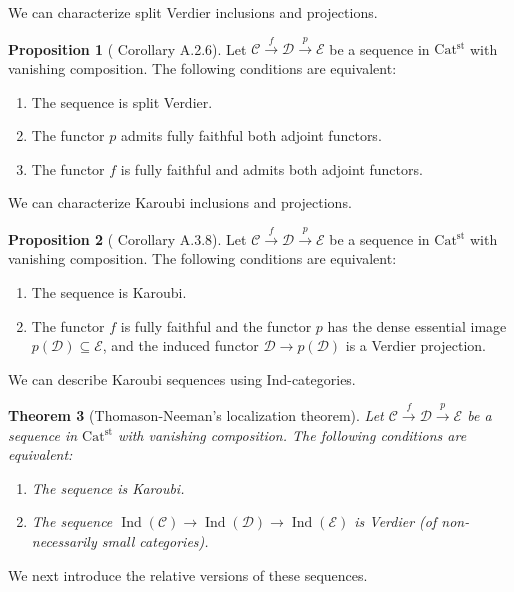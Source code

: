 \documentclass[a4paper,dvipdfmx,11pt,reqno]{amsart}
\newcommand{\C}{\mathcal{C}}
\newcommand{\D}{\mathcal{D}}
\newcommand{\E}{\mathcal{E}}
\DeclareMathOperator{\Ind}{Ind}
\newcommand{\Catst}{\mathrm{Cat^{st}}}
\newtheorem{theorem}{Theorem}[section]
\theoremstyle{definition}
\newtheorem{proposition}[theorem]{Proposition}
\begin{document}
We can characterize split Verdier inclusions and projections.

\begin{proposition}[\cite{CDH23} Corollary A.2.6] \label{CDH23.cor.A.2.6}
  Let $\C \xrightarrow{f} \D \xrightarrow{p} \E$ be a sequence in $\Catst$ with vanishing composition.
  The following conditions are equivalent:
  \begin{enumerate}
    \item The sequence is split Verdier.
    \item The functor $p$ admits fully faithful both adjoint functors.
    \item The functor $f$ is fully faithful and admits both adjoint functors.
  \end{enumerate}
\end{proposition}

We can characterize Karoubi inclusions and projections.

\begin{proposition}[\cite{CDH23} Corollary A.3.8] \label{CDH23.cor.A.3.8}
  Let $\C \xrightarrow{f} \D \xrightarrow{p} \E$ be a sequence in $\Catst$ with vanishing composition.
  The following conditions are equivalent:
  \begin{enumerate}
    \item The sequence is Karoubi.
    \item The functor $f$ is fully faithful and the functor $p$ has the dense essential image $p(\D) \subseteq \E$, and the induced functor $\D \to p(\D)$ is a Verdier projection.
  \end{enumerate}
\end{proposition}

We can describe Karoubi sequences using Ind-categories. 

\begin{theorem}[Thomason-Neeman's localization theorem] \label{Ber.thrm.3.47}
  Let $\C \xrightarrow{f} \D \xrightarrow{p} \E$ be a sequence in $\Catst$ with vanishing composition.
  The following conditions are equivalent:
  \begin{enumerate}
    \item The sequence is Karoubi.
    \item The sequence $\Ind(\C) \to \Ind(\D) \to \Ind(\E)$ is Verdier (of non-necessarily small categories).
  \end{enumerate}
\end{theorem}

We next introduce the relative versions of these sequences.
\end{document}
